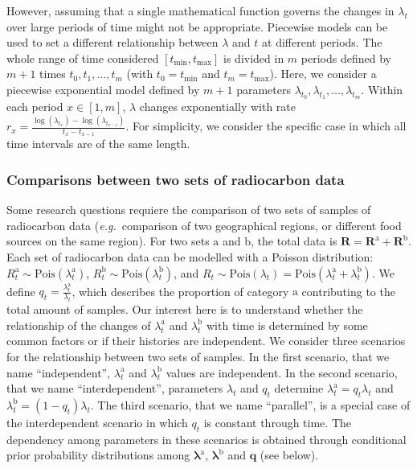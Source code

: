 \documentclass[a4paper]{article}
\begin{document}
However, assuming that a single mathematical function governs the changes in $\lambda_t$ over large periods of time might not be appropriate. Piecewise models can be used to set a different relationship between $\lambda$ and $t$ at different periods. The whole range of time considered $\left[t_{\min}, t_{\max}\right]$ is divided in $m$ periods defined  by $m + 1$  times $t_0, t_1, \dots, t_{m}$ (with $t_0 = t_{\mathrm{min}}$ and $t_{m} = t_{\mathrm{max}}$). Here, we consider a piecewise exponential model defined by $m + 1$ parameters $\lambda_{t_0},\lambda_{t_1},\dots ,\lambda_{t_{m}}$. Within each period $x\in\left[1,m\right]$, $\lambda$ changes exponentially with rate $r_x=\frac{\log\left(\lambda_{t_x}\right)-\log\left(\lambda_{t_{x-1}}\right)}{t_x-t_{x-1}}$. For simplicity, we consider the specific case in which all time intervals are of the same length.
\\


\subsubsection*{Comparisons between two sets of radiocarbon data}

Some research questions requiere the comparison of two sets of samples of radiocarbon data (\emph{e.g.}\ comparison of two geographical regions, or different food sources on the same region). For two sets $\mathrm{a}$ and $\mathrm{b}$, the total data is $\bm{R} = \bm{R}^{\mathrm{a}} + \bm{R}^{\mathrm{b}}$.
Each set of radiocarbon data can be modelled with a Poisson distribution: $R^{\mathrm{a}}_t \sim \mathrm{Pois}(\lambda^{\mathrm{a}}_t)$, $R^{\mathrm{b}}_t \sim \mathrm{Pois}(\lambda^{\mathrm{b}}_t)$, and $R_t \sim \mathrm{Pois}(\lambda_t) = \mathrm{Pois}(\lambda^{\mathrm{a}}_t + \lambda^{\mathrm{b}}_t)$. We define $q_t=\frac{\lambda^{\mathrm{a}}_t}{\lambda_t}$, which describes the proportion of category $\mathrm{a}$ contributing to the total amount of samples. Our interest here is to understand whether the relationship of the changes of $\lambda^{\mathrm{a}}_t$ and $\lambda^{\mathrm{b}}_t$ with time is determined by some common factors or if their histories are independent. We consider three scenarios for the relationship between two sets of samples. In the first scenario, that we name ``independent'', $\lambda^{\mathrm{a}}_t$ and $\lambda^{\mathrm{b}}_t$ values are independent. In the second scenario, that we name ``interdependent'', parameters $\lambda_t$ and $q_t$ determine $\lambda^{\mathrm{a}}_t=q_t\lambda_t$ and $\lambda^{\mathrm{b}}_t=(1-q_t)\lambda_t$. The third scenario, that we name ``parallel'', is a special case of the interdependent scenario in which $q_t$ is constant through time. The dependency among parameters in these scenarios is obtained through conditional prior probability distributions among $\bm{\lambda}^{\mathrm{a}}$, $\bm{\lambda}^{\mathrm{b}}$ and $\bm{q}$ (see below).
\\
\end{document}
